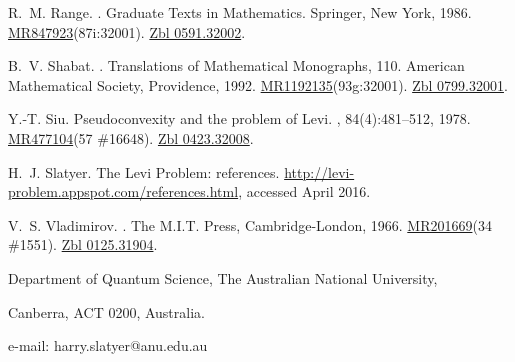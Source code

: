 \documentclass[11pt,a4paper, final, twoside]{article}
\numberwithin{equation}{section}
\begin{document}
\begin{thebibliography}{10}
R.~M. Range.
.
\newblock Graduate Texts in Mathematics. Springer, New York, 1986.
\newblock
  \href{http://www.ams.org/mathscinet-getitem?mr=847923}{MR847923}(87i:32001).
  \href{http://zbmath.org/?q=an:0591.32002}{Zbl 0591.32002}.

B.~V. Shabat.
.
\newblock Translations of Mathematical Monographs, 110. American Mathematical
  Society, Providence, 1992.
\newblock
  \href{http://www.ams.org/mathscinet-getitem?mr=1192135}{MR1192135}(93g:32001).
  \href{http://zbmath.org/?q=an:0799.32001}{Zbl 0799.32001}.

Y.-T. Siu.
\newblock Pseudoconvexity and the problem of {L}evi.
, 84(4):481--512,
  1978.
\newblock \href{http://www.ams.org/mathscinet-getitem?mr=477104}{MR477104}(57
  \#16648). \href{http://zbmath.org/?q=an:0423.32008}{Zbl 0423.32008}.

H.~J. Slatyer.
\newblock The Levi Problem: references.
\newblock \url{http://levi-problem.appspot.com/references.html},
  accessed April 2016.

V.~S. Vladimirov.
.
\newblock The M.I.T. Press, Cambridge-London, 1966.
\newblock \href{http://www.ams.org/mathscinet-getitem?mr=201669}{MR201669}(34
  \#1551). \href{http://zbmath.org/?q=an:0125.31904}{Zbl 0125.31904}.

\end{thebibliography}

{\footnotesize Department of Quantum Science, The Australian National University,}

{\footnotesize Canberra, ACT 0200, Australia.}

{\footnotesize e-mail: harry.slatyer@anu.edu.au}
\end{document}
